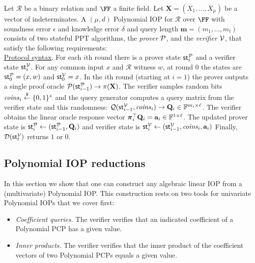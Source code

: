 \begin{definition} 
Let $\mathcal{R}$ be a binary relation and $\FF$ a finite field. Let $\mathbf{X} = (X_1, \ldots, X_\mu)$ be a vector of indeterminates. A $(\mu, d)$ Polynomial IOP for $\mathcal{R}$ over $\FF$ with soundness error $\epsilon$ and knowledge error $\delta$ and query length $\mathbf{m} = (m_1,...,m_t)$ consists of two stateful PPT algorithms, the \emph{prover} $\mathcal{P}$, and the
\emph{verifier} $\mathcal{V}$, that satisfy the following requirements:\\

\noindent \underline{Protocol syntax}. 
For each $i$th round there is a prover state $\textsf{st}^\mathcal{P}_i$ and a verifier state $\textsf{st}^\mathcal{V}_i$. For any common input $x$ and $\mathcal{R}$ witness $w$, at round 0 the states are $\textsf{st}^\mathcal{P}_0 = (x, w)$ and $\textsf{st}^\mathcal{V}_0 = x$. 
In the $i$th round (starting at $i = 1$) the prover outputs a single proof oracle $\mathcal{P}(\textsf{st}^\mathcal{P}_{i-1}) \rightarrow \pi(\mathbf{X})$. The verifier samples random bits $\mathit{coins}_i \overset{\$}{\gets} \{0,1\}^*$ and the query generator computes a query matrix from the verifier state and this randomness: $\mathcal{Q}(\textsf{st}^\mathcal{V}_{i-1}, \mathit{coins}_i) \rightarrow \mathbf{Q}_i \in \mathbb{F}^{m_i \times \ell}$. The verifier obtains the linear oracle response vector $\boldsymbol{\pi}_i^\top \mathbf{Q}_i = \mathbf{a}_i \in \mathbb{F}^{1 \times \ell}$. The updated prover state is $\textsf{st}^\mathcal{P}_i \leftarrow (\textsf{st}^\mathcal{P}_{i-1}, \mathbf{Q}_i)$
and verifier state is $\textsf{st}^\mathcal{V}_i \leftarrow (\textsf{st}^\mathcal{V}_{i-1}, \mathit{coins}_i, \mathbf{a}_i)$
Finally, $\mathcal{D}(\textsf{st}^\mathcal{V}_t)$ returns $1$ or $0$. \\ 
\end{definition}

\subsection{Polynomial IOP reductions} 

In this section we show that one can construct any algebraic linear IOP from a (multivariate) Polynomial IOP. This construction rests on two tools for univariate Polynomial IOPs that we cover first:
\begin{itemize}
    \item \emph{Coefficient queries.} The verifier verifies that an indicated coefficient of a Polynomial PCP has a given value.
    \item \emph{Inner products.} The verifier verifies that the inner product of the coefficient vectors of two Polynomial PCPs equals a given value.
\end{itemize}

